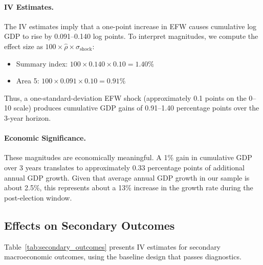 \documentclass[12pt,a4paper]{article}
\begin{document}
\paragraph{IV Estimates.}
The IV estimates imply that a one-point increase in EFW causes cumulative 
log GDP to rise by 0.091--0.140 log points. To interpret magnitudes, we 
compute the effect size as $100 \times \hat{\rho} \times \sigma_{\text{shock}}$:
\begin{itemize}[noitemsep]
    \item Summary index: $100 \times 0.140 \times 0.10 = 1.40\%$
    \item Area 5: $100 \times 0.091 \times 0.10 = 0.91\%$
\end{itemize}
Thus, a one-standard-deviation EFW shock (approximately 0.1 points on 
the 0--10 scale) produces cumulative GDP gains of 0.91--1.40 percentage 
points over the 3-year horizon.

\paragraph{Economic Significance.}
These magnitudes are economically meaningful. A 1\% gain in cumulative 
GDP over 3 years translates to approximately 0.33 percentage points of 
additional annual GDP growth. Given that average annual GDP growth in 
our sample is about 2.5\%, this represents about a 13\% increase in the 
growth rate during the post-election window.

\subsection{Effects on Secondary Outcomes}

Table~\ref{tab:secondary_outcomes} presents IV estimates for secondary 
macroeconomic outcomes, using the baseline design that passes diagnostics.
\end{document}
